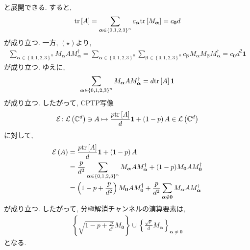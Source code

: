 \begin{ex}
\begin{align*}
    \end{align*}
    と展開できる. すると, 
    \begin{align*}
        \mathrm{tr}\left[A\right] = \sum_{\bm{\alpha} \in \left\{0,1,2,3\right\}^n} c_{\bm{\alpha}} \mathrm{tr}\left[M_{\bm{\alpha}}\right]
        =
        c_{\bm{0}}d
    \end{align*}
    が成り立つ. 一方, $(\star)$より, 
    \begin{align*}
        \sum_{\bm{\alpha} \in \left\{0,1,2,3\right\}^n} 
        M_{\bm{\alpha}} A M_{\bm{\alpha}}^\dagger
        =
        \sum_{\bm{\alpha} \in \left\{0,1,2,3\right\}^n} 
        \sum_{\bm{\beta} \in \left\{0,1,2,3\right\}^n}
        c_{\bm{\beta}} 
        M_{\bm{\alpha}} M_{\bm{\beta}} M_{\bm{\alpha}}^\dagger
        =
        c_{\bm{0}}d^2 \mathbf{1}
    \end{align*}
    が成り立つ. ゆえに, 
    \begin{align*}
        \sum_{\bm{\alpha} \in \left\{0,1,2,3\right\}^n} 
        M_{\bm{\alpha}} A M_{\bm{\alpha}}^\dagger
        =
        d \mathrm{tr}\left[A\right]\mathbf{1}
    \end{align*}
    が成り立つ. したがって, CPTP写像
    \begin{align*}
        \mathcal{E} \colon \mathcal{L}\left({\mathbb{C}^{d}}\right) \ni A \mapsto \frac{p \mathrm{tr}\left[ A\right]}{d}\mathbf{1} + \left(1-p\right)A \in \mathcal{L}\left({\mathbb{C}^{d}}\right)
    \end{align*}
    に対して, 
    \begin{align*}
        \mathcal{E} \left(A\right)
        &=
        \frac{p \mathrm{tr}\left[ A\right]}{d}\mathbf{1} + \left(1-p\right)A
        \\
        &=
        \frac{p}{d^2}
        \sum_{\bm{\alpha} \in \left\{0,1,2,3\right\}^n} 
        M_{\bm{\alpha}} A M_{\bm{\alpha}}^\dagger
        +
        (1-p)
        M_{\bm{0}} A M_{\bm{0}}^\dagger
        \\
        &=
        \left( 1 - p + \frac{p}{d^2}\right)
        M_{\bm{0}} A M_{\bm{0}}^\dagger
        +
        \frac{p}{d^2}
        \sum_{\bm{\alpha} \notin \bm{0}}
        M_{\bm{\alpha}} A M_{\bm{\alpha}}^\dagger
    \end{align*}
    が成り立つ. したがって, 分極解消チャンネルの演算要素は, 
    \begin{align*}
        \left\{ 
            \sqrt{1-p+\frac{p}{d^2}} M_{\bm{0}}
        \right\}
        \cup
        \left\{
            \frac{\sqrt{p}}{d} M_{\bm{\alpha}}
        \right\}_{\bm{\alpha}\neq\bm{0}}
    \end{align*}
    となる.
\end{ex}


